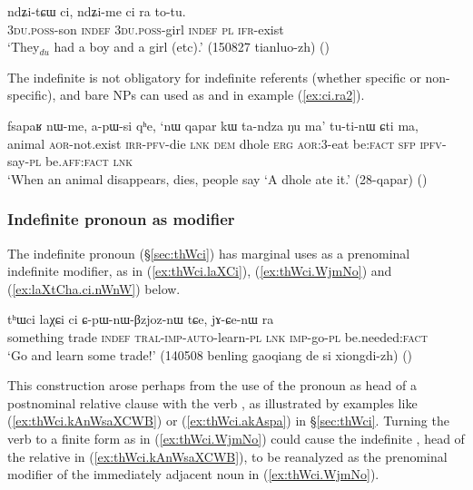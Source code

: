 \begin{exe}
\ex \label{ex:ci.ra}
 \gll  ndʑi-tɕɯ ci, ndʑi-me ci ra to-tu. \\
 \textsc{3du}.\textsc{poss}-son \textsc{indef}  \textsc{3du}.\textsc{poss}-girl \textsc{indef} \textsc{pl} \textsc{ifr}-exist \\
 \glt  `They$_{du}$ had a boy and a girl (etc).' (150827 tianluo-zh)
()
\end{exe}

 The indefinite  is not obligatory for indefinite referents (whether specific or non-specific), and bare NPs can used as  and  in example (\ref{ex:ci.ra2}).
 

\begin{exe}
\ex \label{ex:ci.ra2}
 \gll  fsapaʁ nɯ-me, a-pɯ-si qʰe, `nɯ qapar kɯ ta-ndza ŋu ma' tu-ti-nɯ ɕti ma, \\
 animal \textsc{aor}-not.exist \textsc{irr}-\textsc{pfv}-die \textsc{lnk} \textsc{dem} dhole \textsc{erg} \textsc{aor}:3\flobv{}-eat be:\textsc{fact} \textsc{sfp} \textsc{ipfv}-say-\textsc{pl} be.\textsc{aff}:\textsc{fact} \textsc{lnk}  \\
 \glt `When an animal disappears, dies, people say `A dhole ate it.' (28-qapar)
()
\end{exe}


\subsubsection{Indefinite pronoun as modifier} \label{sec:indefinite}
The indefinite pronoun  (§\ref{sec:thWci}) has marginal uses as a prenominal indefinite modifier, as in  (\ref{ex:thWci.laXCi}), (\ref{ex:thWci.WjmNo}) and (\ref{ex:laXtCha.ci.nWnW}) below. 

\begin{exe}
\ex \label{ex:thWci.laXCi}
\gll   tʰɯci laχɕi ci ɕ-pɯ-nɯ-βzjoz-nɯ tɕe, jɤ-ɕe-nɯ ra \\
something trade \textsc{indef} \textsc{tral}-\textsc{imp}-\textsc{auto}-learn-\textsc{pl} \textsc{lnk} \textsc{imp}-go-\textsc{pl} be.needed:\textsc{fact} \\
\glt `Go and learn some trade!' (140508 benling gaoqiang de si xiongdi-zh)
()
 \end{exe}
 
 This construction arose perhaps from the use of the pronoun  as head of a postnominal relative clause with the verb , as illustrated by examples like (\ref{ex:thWci.kAnWsaXCWB}) or (\ref{ex:thWci.akAspa}) in §\ref{sec:thWci}. Turning the verb  to a finite form as in (\ref{ex:thWci.WjmNo}) could cause the indefinite , head of the relative in (\ref{ex:thWci.kAnWsaXCWB}), to be reanalyzed as the prenominal modifier of the immediately adjacent noun in (\ref{ex:thWci.WjmNo}).


